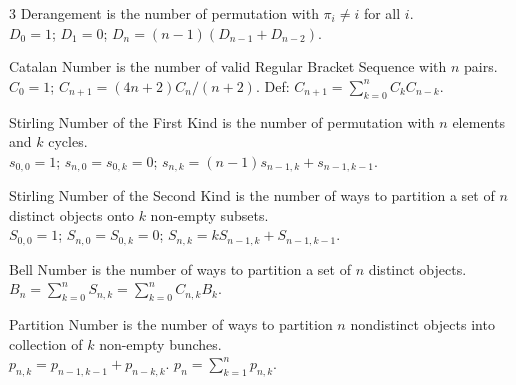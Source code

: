 \documentclass[landscape, 8pt, a4paper, oneside]{extarticle}
\begin{document}
\begin{multicols*}{3}
Derangement is the number of permutation with $\pi_i \neq i$ for all $i$. \\
$D_0 = 1$; $D_1 = 0$; $D_n = (n-1)(D_{n-1} + D_{n-2})$.

Catalan Number is the number of valid Regular Bracket Sequence with $n$ pairs. \\
$C_0 = 1$; $C_{n+1} = (4n+2) C_n / (n+2)$. Def: $C_{n+1} = \sum_{k=0}^{n} C_k C_{n-k}$.

Stirling Number of the First Kind is the number of permutation with $n$ elements and $k$ cycles. \\
$s_{0, 0} = 1$; $s_{n, 0} = s_{0, k} = 0$; $s_{n, k} = (n-1) s_{n-1, k} + s_{n-1, k-1}$.

Stirling Number of the Second Kind is the number of ways to partition a set of $n$ distinct objects onto $k$ non-empty subsets. \\
$S_{0, 0} = 1$; $S_{n, 0} = S_{0, k} = 0$; $S_{n, k} = k S_{n-1, k} + S_{n-1, k-1}$.

Bell Number is the number of ways to partition a set of $n$ distinct objects. \\
$B_n = \sum_{k=0}^{n} S_{n, k} = \sum_{k=0}^{n} C_{n, k} B_k$.

Partition Number is the number of ways to partition $n$ nondistinct objects into collection of $k$ non-empty bunches. \\
$p_{n, k} = p_{n-1, k-1} + p_{n-k, k}$. $p_n = \sum_{k=1}^{n} p_{n, k}$.

\end{multicols*}
\end{document}
